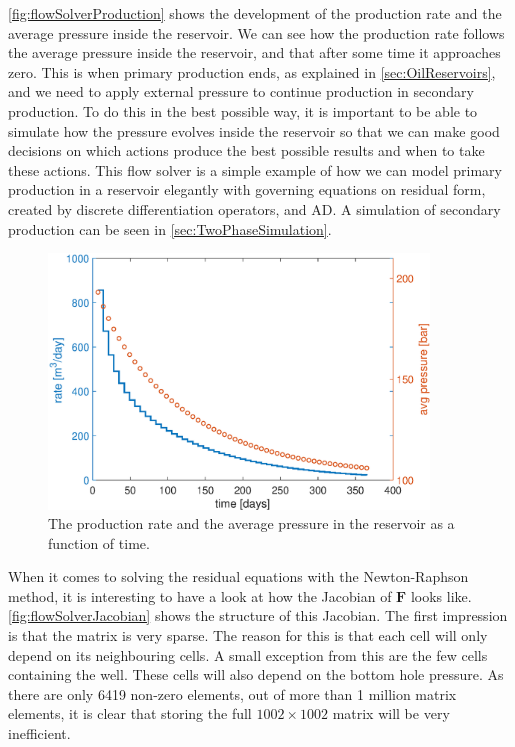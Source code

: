 \autoref{fig:flowSolverProduction} shows the development of the production rate and the average pressure inside the reservoir. We can see how the production rate follows the average pressure inside the reservoir, and that after some time it approaches zero. This is when primary production ends, as explained in \autoref{sec:OilReservoirs}, and we need to apply external pressure to continue production in secondary production. To do this in the best possible way, it is important to be able to simulate how the pressure evolves inside the reservoir so that we can make good decisions on which actions produce the best possible results and when to take these actions. This flow solver is a simple example of how we can model primary production in a reservoir elegantly with governing equations on residual form, created by discrete differentiation operators, and AD. A simulation of secondary production can be seen in \autoref{sec:TwoPhaseSimulation}.
\begin{figure}[H]
    \centering
    \includegraphics[width = 0.9\textwidth]{figures/flow_solver_production.eps}
    \caption{The production rate and the average pressure in the reservoir as a function of time.}
    \label{fig:flowSolverProduction}
\end{figure}

When it comes to solving the residual equations with the Newton-Raphson method, it is interesting to have a look at how the Jacobian of $\boldsymbol{F}$ looks like. \autoref{fig:flowSolverJacobian} shows the structure of this Jacobian. The first impression is that the matrix is very sparse. The reason for this is that each cell will only depend on its neighbouring cells. A small exception from this are the few cells containing the well. These cells will also depend on the bottom hole pressure. As there are only 6419 non-zero elements, out of more than 1 million matrix elements, it is clear that storing the full $1002\times 1002$ matrix will be very inefficient.

